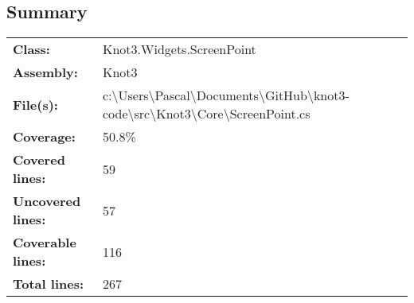 \documentclass[a4paper,10pt]{article}
\begin{document}
\subsection{Summary}
\begin{longtable}[l]{ll}
\textbf{Class:} & Knot3.Widgets.ScreenPoint\\
\textbf{Assembly:} & Knot3\\
\textbf{File(s):} & \begin{minipage}[t]{12cm}{c:\textbackslash Users\textbackslash Pascal\textbackslash Documents\textbackslash GitHub\textbackslash knot3-code\textbackslash src\textbackslash Knot3\textbackslash Core\textbackslash ScreenPoint.cs}\end{minipage} \\
\textbf{Coverage:} & 50.8\%\\
\textbf{Covered lines:} & 59\\
\textbf{Uncovered lines:} & 57\\
\textbf{Coverable lines:} & 116\\
\textbf{Total lines:} & 267\\
\end{longtable}
\end{document}
